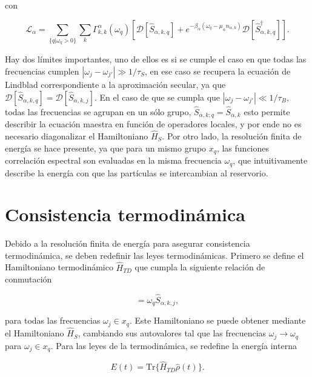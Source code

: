 con

\begin{equation}
    \mathcal{L}_{\alpha} = \sum_{\{q|\omega_{q}>0\}} \sum_{k}\Gamma^{\alpha}_{k,k}(\omega_{q}) \left[ \mathcal{D}[\hat{S}_{\alpha,k,q}] + e^{-\beta_{\alpha}(\omega_{q} - \mu_{\alpha}n_{\alpha,k})}\mathcal{D}[\hat{S}^{\dagger}_{\alpha,k,q}]  \right].
\label{sec2lindbladconsistency}
\end{equation}

Hay dos límites importantes, uno de ellos es si se cumple el caso en que todas las frecuencias cumplen $|\omega_{j}-\omega_{j'}| \gg 1/\tau_{S}$, en ese caso se recupera la ecuación de Lindblad correspondiente a la aproximación secular, ya que $\mathcal{D}[\hat{S}_{\alpha,k,q}] = \mathcal{D}[\hat{S}_{\alpha,k,j}]$. En el caso de que se cumpla que $|\omega_{j}-\omega_{j'}| \ll 1/\tau_{B}$, todas las frecuencias se agrupan en un sólo grupo, $\hat{S}_{\alpha,k;q} = \hat{S}_{\alpha,k}$ esto permite describir la ecuación maestra en función de operadores locales, y por ende no es necesario diagonalizar el Hamiltoniano $\hat{H}_{S}$\cite{wichterich2007modeling}. Por otro lado, la resolución finita de energía se hace presente, ya  que para un mismo grupo $x_{q}$, las funciones correlación espectral son evaluadas en la misma frecuencia $\omega_{q}$, que intuitivamente describe la energía con que las partículas se intercambian al reservorio.  

\section{Consistencia termodinámica}
Debido a la resolución finita de energía para asegurar consistencia termodinámica, se deben redefinir las leyes termodinámicas. Primero se define el Hamiltoniano termodinámico $\hat{H}_{TD}$ que cumpla la siguiente relación de conmutación

\begin{equation*}
    [\hat{S}_{\alpha,k,j},\hat{H}_{TD}] = \omega_{q}\hat{S}_{\alpha,k,j},
\end{equation*}

para todas las frecuencias $\omega_{j} \in x_{q}$. Este Hamiltoniano se puede obtener mediante el Hamiltoniano $\hat{H}_{S}$, cambiando sus autovalores tal que las frecuencias $\omega_{j} \to \omega_{q}$ para $\omega_{j} \in x_{q}$. Para las leyes de la termodinámica, se redefine la energía interna

\begin{equation*}
    E(t) = \text{Tr}\{\hat{H}_{TD}\hat{\rho}(t) \}.
\end{equation*}


